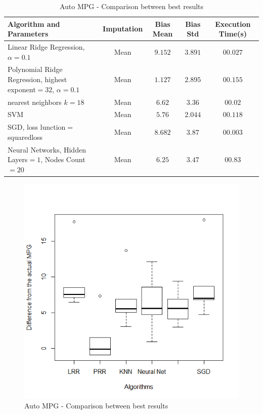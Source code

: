 		\begin{table}
\begin{center}
\begin{tabular}{|p{4cm}|c|c|c|c|}
\hline Algorithm and Parameters & Imputation & Bias Mean & Bias Std & Execution Time(s)\\

\hline Linear Ridge Regression, $\alpha=0.1$ & Mean & $9.152$ & $3.891$ & $00.027$ \\

\hline Polynomial Ridge Regression, highest exponent$=32$, $\alpha=0.1$ & Mean & $\mathbf{1.127}$ & $2.895$ & $00.155$  \\

\hline nearest neighbors $k=18$ & Mean & $6.62$ & $3.36$ & $00.02$  \\

\hline SVM & Mean & $5.76$ & $\mathbf{2.044}$ & $00.118$  \\

\hline SGD, loss lunction$=$squaredloss & Mean & $8.682$ & $3.87$ & $\mathbf{00.003}$  \\

\hline Neural Networks, Hidden Layers$=1$, Nodes Count$=20$ & Mean & $6.25$ & $3.47$ & $00.83$  \\

\hline
\end{tabular}
    \caption{Auto MPG - Comparison between best results}
    \label{table:db1-results}
\end{center}
    \end{table}


\begin{figure}
	\center
	\includegraphics[scale=\figurescaling]{figures/mpg_bestresults.png}
	\caption{Auto MPG - Comparison between best results\label{fig:db1-mpg_bestresults}}
\end{figure}
